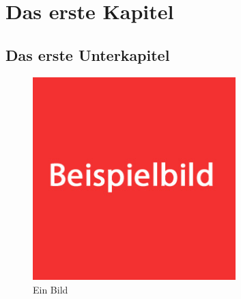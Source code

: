 \section{Das erste Kapitel}
\subsection{Das erste Unterkapitel}

\begin{figure}[htbp]
	\centering
  \includegraphics[width=0.7\textwidth]{images/test.jpg}
	\caption{Ein Bild}
	\label{fig1}
\end{figure}


